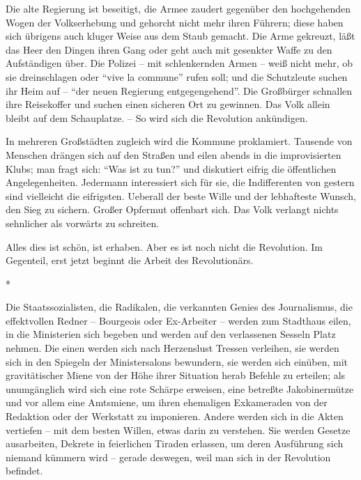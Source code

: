 \documentclass{scrbook}
\begin{document}
Die alte Regierung ist beseitigt, die Armee zaudert gegenüber den hochgehenden Wogen der Volkserhebung und gehorcht nicht mehr ihren Führern; diese haben sich übrigens auch kluger Weise aus dem Staub gemacht. Die Arme gekreuzt, läßt das Heer den Dingen ihren Gang oder geht auch mit gesenkter Waffe zu den Aufständigen über. Die Polizei – mit schlenkernden Armen – weiß nicht mehr, ob sie dreinschlagen oder ``vive la commune'' rufen soll; und die Schutzleute suchen ihr Heim auf – ``der neuen Regierung entgegengehend''. Die Großbürger schnallen ihre Reisekoffer und suchen einen sicheren Ort zu gewinnen. Das Volk allein bleibt auf dem Schauplatze. – So wird sich die Revolution ankündigen.

In mehreren Großstädten zugleich wird die Kommune proklamiert. Tausende von Menschen drängen sich auf den Straßen und eilen abends in die improvisierten Klubs; man fragt sich: ``Was ist zu tun?'' und diskutiert eifrig die öffentlichen Angelegenheiten. Jedermann interessiert sich für sie, die Indifferenten von gestern sind vielleicht die eifrigsten. Ueberall der beste Wille und der lebhafteste Wunsch, den Sieg zu sichern. Großer Opfermut offenbart sich. Das Volk verlangt nichts sehnlicher als vorwärts zu schreiten.

Alles dies ist schön, ist erhaben. Aber es ist noch nicht die Revolution. Im Gegenteil, erst jetzt beginnt die Arbeit des Revolutionärs.

\begin{center}*\end{center}

Die Staatssozialisten, die Radikalen, die verkannten Genies des Journalismus, die effektvollen Redner – Bourgeois oder Ex-Arbeiter – werden zum Stadthaus eilen, in die Ministerien sich begeben und werden auf den verlassenen Sesseln Platz nehmen. Die einen werden sich nach Herzenslust Tressen verleihen, sie werden sich in den Spiegeln der Ministersalons bewundern, sie werden sich einüben, mit gravitätischer Miene von der Höhe ihrer Situation herab Befehle zu erteilen; als unumgänglich wird sich eine rote Schärpe erweisen, eine betreßte Jakobinermütze und vor allem eine Amtsmiene, um ihren ehemaligen Exkameraden von der Redaktion oder der Werkstatt zu imponieren. Andere werden sich in die Akten vertiefen – mit dem besten Willen, etwas darin zu verstehen. Sie werden Gesetze ausarbeiten, Dekrete in feierlichen Tiraden erlassen, um deren Ausführung sich niemand kümmern wird – gerade deswegen, weil man sich in der Revolution befindet.
\end{document}
